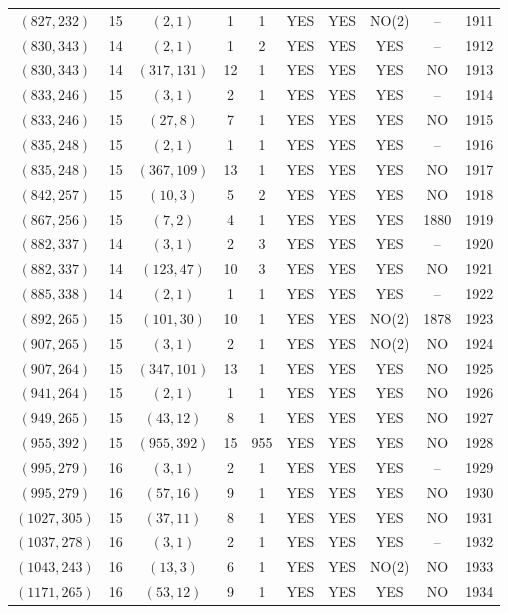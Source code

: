 \begin{longtable}{|c|c|c|c|c|c|c|c|c|c|}
$(827, 232)$ & 15 & $(2, 1)$ & 1 & 1 & YES & YES & NO(2) & -- & 1911\\
$(830, 343)$ & 14 & $(2, 1)$ & 1 & 2 & YES & YES & YES & -- & 1912\\
$(830, 343)$ & 14 & $(317, 131)$ & 12 & 1 & YES & YES & YES & NO & 1913\\
$(833, 246)$ & 15 & $(3, 1)$ & 2 & 1 & YES & YES & YES & -- & 1914\\
$(833, 246)$ & 15 & $(27, 8)$ & 7 & 1 & YES & YES & YES & NO & 1915\\
$(835, 248)$ & 15 & $(2, 1)$ & 1 & 1 & YES & YES & YES & -- & 1916\\
$(835, 248)$ & 15 & $(367, 109)$ & 13 & 1 & YES & YES & YES & NO & 1917\\
$(842, 257)$ & 15 & $(10, 3)$ & 5 & 2 & YES & YES & YES & NO & 1918\\
$(867, 256)$ & 15 & $(7, 2)$ & 4 & 1 & YES & YES & YES & 1880 & 1919\\
$(882, 337)$ & 14 & $(3, 1)$ & 2 & 3 & YES & YES & YES & -- & 1920\\
$(882, 337)$ & 14 & $(123, 47)$ & 10 & 3 & YES & YES & YES & NO & 1921\\
$(885, 338)$ & 14 & $(2, 1)$ & 1 & 1 & YES & YES & YES & -- & 1922\\
$(892, 265)$ & 15 & $(101, 30)$ & 10 & 1 & YES & YES & NO(2) & 1878 & 1923\\
$(907, 265)$ & 15 & $(3, 1)$ & 2 & 1 & YES & YES & NO(2) & NO & 1924\\
$(907, 264)$ & 15 & $(347, 101)$ & 13 & 1 & YES & YES & YES & NO & 1925\\
$(941, 264)$ & 15 & $(2, 1)$ & 1 & 1 & YES & YES & YES & NO & 1926\\
$(949, 265)$ & 15 & $(43, 12)$ & 8 & 1 & YES & YES & YES & NO & 1927\\
$(955, 392)$ & 15 & $(955, 392)$ & 15 & 955 & YES & YES & YES & NO & 1928\\
$(995, 279)$ & 16 & $(3, 1)$ & 2 & 1 & YES & YES & YES & -- & 1929\\
$(995, 279)$ & 16 & $(57, 16)$ & 9 & 1 & YES & YES & YES & NO & 1930\\
$(1027, 305)$ & 15 & $(37, 11)$ & 8 & 1 & YES & YES & YES & NO & 1931\\
$(1037, 278)$ & 16 & $(3, 1)$ & 2 & 1 & YES & YES & YES & -- & 1932\\
$(1043, 243)$ & 16 & $(13, 3)$ & 6 & 1 & YES & YES & NO(2) & NO & 1933\\
$(1171, 265)$ & 16 & $(53, 12)$ & 9 & 1 & YES & YES & YES & NO & 1934\\

\end{longtable}
